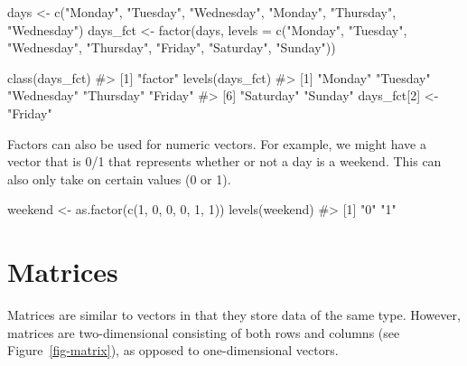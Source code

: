 \documentclass[
  letterpaper,
]{latex/krantz}
\makeatletter
\newenvironment{Shaded}{\begin{snugshade}}{\end{snugshade}}
\newcommand{\AttributeTok}[1]{\textcolor[rgb]{0.40,0.45,0.13}{#1}}
\newcommand{\CommentTok}[1]{\textcolor[rgb]{0.37,0.37,0.37}{#1}}
\newcommand{\DecValTok}[1]{\textcolor[rgb]{0.68,0.00,0.00}{#1}}
\newcommand{\FunctionTok}[1]{\textcolor[rgb]{0.28,0.35,0.67}{#1}}
\newcommand{\NormalTok}[1]{\textcolor[rgb]{0.00,0.23,0.31}{#1}}
\newcommand{\OtherTok}[1]{\textcolor[rgb]{0.00,0.23,0.31}{#1}}
\newcommand{\StringTok}[1]{\textcolor[rgb]{0.13,0.47,0.30}{#1}}
\newenvironment{kframe}{%
\medskip{}
\setlength{\fboxsep}{.8em}
 \def\at@end@of@kframe{}%
 \ifinner\ifhmode%
  \def\at@end@of@kframe{\end{minipage}}%
  \begin{minipage}{\columnwidth}%
 \fi\fi%
 \def\FrameCommand##1{\hskip\@totalleftmargin \hskip-\fboxsep
 \colorbox{shadecolor}{##1}\hskip-\fboxsep
     \hskip-\linewidth \hskip-\@totalleftmargin \hskip\columnwidth}%
 \MakeFramed {\advance\hsize-\width
   \@totalleftmargin\z@ \linewidth\hsize
   \@setminipage}}%
 {\par\unskip\endMakeFramed%
 \at@end@of@kframe}
\renewenvironment{Shaded}{\begin{kframe}}{\end{kframe}}
\makeatother
\begin{document}
\begin{Shaded}
\begin{Highlighting}[]
\NormalTok{days }\OtherTok{\textless{}{-}} \FunctionTok{c}\NormalTok{(}\StringTok{"Monday"}\NormalTok{, }\StringTok{"Tuesday"}\NormalTok{, }\StringTok{"Wednesday"}\NormalTok{, }\StringTok{"Monday"}\NormalTok{, }\StringTok{"Thursday"}\NormalTok{, }
          \StringTok{"Wednesday"}\NormalTok{)}
\NormalTok{days\_fct }\OtherTok{\textless{}{-}} \FunctionTok{factor}\NormalTok{(days, }
               \AttributeTok{levels =} \FunctionTok{c}\NormalTok{(}\StringTok{"Monday"}\NormalTok{, }\StringTok{"Tuesday"}\NormalTok{, }\StringTok{"Wednesday"}\NormalTok{, }
                          \StringTok{"Thursday"}\NormalTok{, }\StringTok{"Friday"}\NormalTok{, }\StringTok{"Saturday"}\NormalTok{, }\StringTok{"Sunday"}\NormalTok{))}

\FunctionTok{class}\NormalTok{(days\_fct)}
\CommentTok{\#\textgreater{} [1] "factor"}
\FunctionTok{levels}\NormalTok{(days\_fct)}
\CommentTok{\#\textgreater{} [1] "Monday"    "Tuesday"   "Wednesday" "Thursday"  "Friday"   }
\CommentTok{\#\textgreater{} [6] "Saturday"  "Sunday"}
\NormalTok{days\_fct[}\DecValTok{2}\NormalTok{] }\OtherTok{\textless{}{-}} \StringTok{"Friday"}
\end{Highlighting}
\end{Shaded}

Factors can also be used for numeric vectors. For example, we might have
a vector that is 0/1 that represents whether or not a day is a weekend.
This can also only take on certain values (0 or 1).

\begin{Shaded}
\begin{Highlighting}[]
\NormalTok{weekend }\OtherTok{\textless{}{-}} \FunctionTok{as.factor}\NormalTok{(}\FunctionTok{c}\NormalTok{(}\DecValTok{1}\NormalTok{, }\DecValTok{0}\NormalTok{, }\DecValTok{0}\NormalTok{, }\DecValTok{0}\NormalTok{, }\DecValTok{1}\NormalTok{, }\DecValTok{1}\NormalTok{))}
\FunctionTok{levels}\NormalTok{(weekend)}
\CommentTok{\#\textgreater{} [1] "0" "1"}
\end{Highlighting}
\end{Shaded}

\section{\texorpdfstring{Matrices
}{Matrices }}\label{matrices}

Matrices are similar to vectors in that they store data of the same
type. However, matrices are two-dimensional consisting of both rows and
columns (see Figure~\ref{fig-matrix}), as opposed to one-dimensional
vectors.
\end{document}
